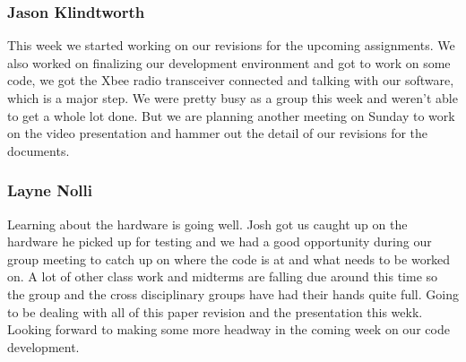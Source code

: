 \documentclass[10pt,draftclsnofoot,onecolumn]{IEEEtran}
\begin{document}
\subsubsection{Jason Klindtworth}
This week we started working on our revisions for the upcoming assignments. We also worked on finalizing our development environment and got to work on some code, we got the Xbee radio transceiver connected and talking with our software, which is a major step. We were pretty busy as a group this week and weren't able to get a whole lot done. But we are planning another meeting on Sunday to work on the video presentation and hammer out the detail of our revisions for the documents. \par

\subsubsection{Layne Nolli}
Learning about the hardware is going well. Josh got us caught up on the hardware he picked up for testing and we had a good opportunity during our group meeting to catch up on where the code is at and what needs to be worked on. A lot of other class work and midterms are falling due around this time so the group and the cross disciplinary groups have had their hands quite full. Going to be dealing with all of this paper revision and the presentation this wekk. Looking forward to making some more headway in the coming week on our code development. \par
\end{document}
